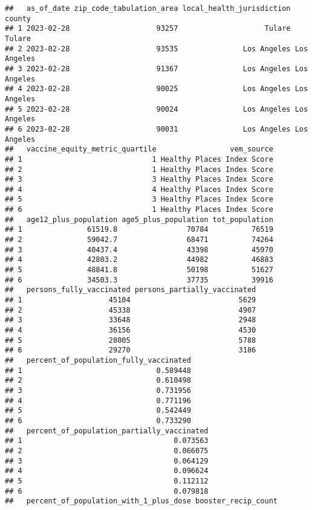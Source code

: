 \documentclass[
]{article}
\begin{document}
\begin{verbatim}
##   as_of_date zip_code_tabulation_area local_health_jurisdiction      county
## 1 2023-02-28                    93257                    Tulare      Tulare
## 2 2023-02-28                    93535               Los Angeles Los Angeles
## 3 2023-02-28                    91367               Los Angeles Los Angeles
## 4 2023-02-28                    90025               Los Angeles Los Angeles
## 5 2023-02-28                    90024               Los Angeles Los Angeles
## 6 2023-02-28                    90031               Los Angeles Los Angeles
##   vaccine_equity_metric_quartile                 vem_source
## 1                              1 Healthy Places Index Score
## 2                              1 Healthy Places Index Score
## 3                              3 Healthy Places Index Score
## 4                              4 Healthy Places Index Score
## 5                              3 Healthy Places Index Score
## 6                              1 Healthy Places Index Score
##   age12_plus_population age5_plus_population tot_population
## 1               61519.8                70784          76519
## 2               59042.7                68471          74264
## 3               40437.4                43398          45970
## 4               42803.2                44982          46883
## 5               48841.8                50198          51627
## 6               34503.3                37735          39916
##   persons_fully_vaccinated persons_partially_vaccinated
## 1                    45104                         5629
## 2                    45338                         4907
## 3                    33648                         2948
## 4                    36156                         4530
## 5                    28005                         5788
## 6                    29270                         3186
##   percent_of_population_fully_vaccinated
## 1                               0.589448
## 2                               0.610498
## 3                               0.731956
## 4                               0.771196
## 5                               0.542449
## 6                               0.733290
##   percent_of_population_partially_vaccinated
## 1                                   0.073563
## 2                                   0.066075
## 3                                   0.064129
## 4                                   0.096624
## 5                                   0.112112
## 6                                   0.079818
##   percent_of_population_with_1_plus_dose booster_recip_count

\end{verbatim}
\end{document}
